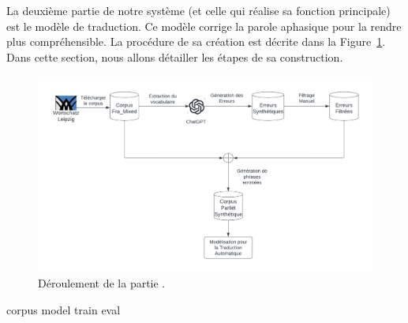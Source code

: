 \section{}

La deuxième partie de notre système (et celle qui réalise sa fonction principale) est le modèle de traduction.
Ce modèle corrige la parole aphasique pour la rendre plus compréhensible.
La procédure de sa création est décrite dans la Figure~\ref{fig.nmt-archi}.
Dans cette section, nous allons détailler les étapes de sa construction.

\begin{figure}[hbt]
    \begin{center}
        \includegraphics[width=\textwidth]{assets/pdf/NMT.pdf}
    \end{center}
    \caption{Déroulement de la partie .}
    \label{fig.nmt-archi}
\end{figure}


{corpus}
{model}
{train}
{eval}